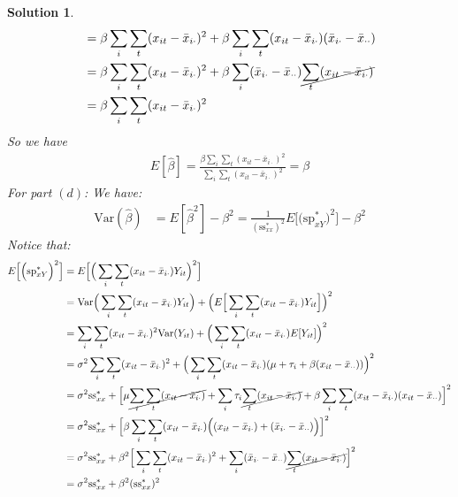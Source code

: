 \documentclass[11pt]{article}
\newtheorem{sol}{Solution}
\begin{document}
\begin{sol}
\begin{align*}
	 &= \beta\sum_i\sum_t(x_{it} - \bar{x}_{i\cdot})^2 + \beta\sum_i\sum_t(x_{it} - \bar{x}_{i\cdot})(\bar{x}_{i\cdot} - \bar{x}_{\cdot\cdot})\\
	 &= \beta\sum_i\sum_t(x_{it} - \bar{x}_{i\cdot})^2 + \beta\sum_i(\bar{x}_{i\cdot} - \bar{x}_{\cdot\cdot})\cancel{\sum_t(x_{it} - \bar{x}_{i\cdot})}\\
	 &= \beta\sum_i\sum_t(x_{it} - \bar{x}_{i\cdot})^2
\end{align*}
So we have
\begin{align*}
	E[\hat{\beta}] = \frac{\beta\sum_i\sum_t(x_{it} - \bar{x}_{i\cdot})^2}{\sum_i\sum_t(x_{it} - \bar{x}_{i\cdot})^2} = \beta
\end{align*}
\vskip 2mm
For part $(d)$:\vskip 2mm
We have:
\begin{align*}
	\text{Var}(\hat{\beta}) &= E[\hat{\beta}^2] - \beta^2 = \frac{1}{(\text{ss}^{\ast}_{xx})^2}E\Big[\Big(\text{sp}_{xY}^{\ast}\Big)^2\Big] - \beta^2
\end{align*}
Notice that:
\begin{align*}
	E\Big[\Big(\text{sp}_{xY}^{\ast}\Big)^2\Big] &= E\Big[\Big(\sum_i\sum_t(x_{it}  - \bar{x}_{i\cdot})Y_{it}\Big)^2\Big] \\ &=\text{Var}\Big(\sum_i\sum_t(x_{it} - \bar{x}_{i\cdot})Y_{it}\Big) + \Big(E\Big[\sum_i\sum_t(x_{it} - \bar{x}_{i\cdot})Y_{it}\Big]\Big)^2\\
	&= \sum_i\sum_t(x_{it} - \bar{x}_{i\cdot})^2\text{Var}(Y_{it}) + \Big(\sum_i\sum_t(x_{it} - \bar{x}_{i\cdot})E[Y_{it}]\Big)^2\\
	&= \sigma^2\sum_i\sum_t(x_{it} - \bar{x}_{i\cdot})^2 + \Big(\sum_i\sum_t(x_{it} - \bar{x}_{i\cdot})(\mu + \tau_i + \beta(x_{it} - \bar{x}_{\cdot\cdot}))\Big)^2\\
	&= \sigma^2\text{ss}^{\ast}_{xx} + \Big[\mu\cancel{\sum_i\sum_t(x_{it} - \bar{x}_{i\cdot})} + \sum_i\tau_i\cancel{\sum_t(x_{it} - \bar{x}_{i\cdot})} + \beta\sum_i\sum_t(x_{it} - \bar{x}_{i\cdot})(x_{it} - \bar{x}_{\cdot\cdot})\Big]^2\\
	&= \sigma^2\text{ss}^{\ast}_{xx} + \Big[\beta\sum_i\sum_t(x_{it} - \bar{x}_{i\cdot})\Big((x_{it} - \bar{x}_{i\cdot}) + (\bar{x}_{i\cdot} - \bar{x}_{\cdot\cdot})\Big)\Big]^2\\
	&= \sigma^2\text{ss}^{\ast}_{xx} + \beta^2\Big[\sum_i\sum_t(x_{it} - \bar{x}_{i\cdot})^2 + \sum_i(\bar{x}_{i\cdot} - \bar{x}_{\cdot\cdot})\cancel{\sum_t(x_{it} - \bar{x}_{i\cdot})}\Big]^2\\
	&=  \sigma^2\text{ss}^{\ast}_{xx} + \beta^2(\text{ss}^{\ast}_{xx})^2
\end{align*}

\end{sol}
\end{document}
